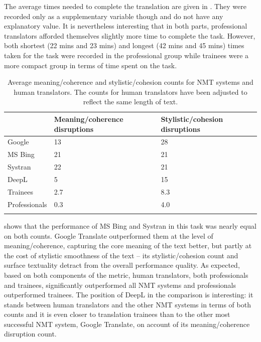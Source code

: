 \documentclass[output=paper]{langscibook}
\begin{document}
The average times needed to complete the translation are given in . They were recorded only as a supplementary variable though and do not have any explanatory value. It is nevertheless interesting that in both parts, professional translators afforded themselves slightly more time to complete the task. However, both shortest (22 mins and 23 mins) and longest (42 mins and 45 mins) times taken for the task were recorded in the professional group while trainees were a more compact group in terms of time spent on the task.

\begin{table}
\begin{tabularx}{\textwidth}{lYY}
\lsptoprule
 & {   {Meaning/coherence}} {   {disruptions} } & {   {Stylistic/cohesion}} {   {disruptions}}\\
 \midrule
Google             & 13    & 28     \\
MS Bing            &  21   &   21   \\
Systran            &  22   &   21   \\
DeepL              &  5    &   15   \\
Trainees           &  2.7  &   8.3  \\
Professionals      &  0.3  &   4.0  \\
\lspbottomrule
\end{tabularx}
\caption{Average meaning/coherence and stylistic/cohesion counts for NMT systems and human translators. The counts for human translators have been adjusted to reflect the same length of text.}
\label{tab:kamenicka:2}
\end{table}

 shows that the performance of MS Bing and Systran in this task was nearly equal on both counts. Google Translate outperformed them at the level of meaning/coherence, capturing the core meaning of the text better, but partly at the cost of stylistic smoothness of the text – its stylistic/cohesion count and surface textuality detract from the overall performance quality. As expected, based on both components of the metric, human translators, both professionals and trainees, significantly outperformed all NMT systems and professionals outperformed trainees. The position of DeepL in the comparison is interesting: it stands between human translators and the other NMT systems in terms of both counts and it is even closer to translation trainees than to the other most successful NMT system, Google Translate, on account of its meaning/coherence disruption count.
\end{document}
